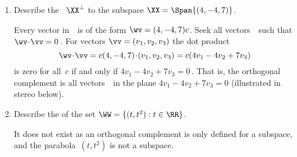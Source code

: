 \begin{reduce}
\begin{example}
\begin{enumerate}[ref=\ref{eg:orthsubsp}(\alph*)]
\item Describe the ~\(\XX^\perp\) to the subspace \(\XX=\Span\{(4,-4,7)\}\).
\begin{solution} 
Every vector in~\WW\ is of the form \(\wv=(4,-4,7)c\).
Seek all vectors~\vv\ such that \(\wv\cdot\vv=0\)\,.  
For vectors \(\vv=(v_1,v_2,v_3)\) the dot product
\begin{equation*}
\wv\cdot\vv
=c(4,-4,7)\cdot(v_1,v_2,v_3)
=c(4v_1-4v_2+7v_3)
\end{equation*}
is zero for all~\(c\) if and only if \(4v_1-4v_2+7v_3=0\)\,. 
That is, the orthogonal complement is all vectors~\vv\ in the plane \(4v_1-4v_2+7v_3=0\)  (illustrated in stereo below).
\begin{center}
\end{center}
\end{solution}


\item Describe the  of the set \(\WW=\{(t,t^2): t\in\RR\}\).
\begin{solution} 
It does not exist as an orthogonal complement is only defined for a subspace, and the parabola~\((t,t^2)\) is not a subspace.
\end{solution}




\end{enumerate}
\end{example}
\end{reduce}
